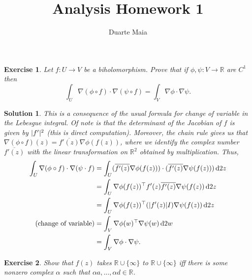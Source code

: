\documentclass{article}
\title{Analysis Homework 1}
\author{Duarte Maia}
\newtheorem{ex}{Exercise}
\theoremstyle{nonumberplain}
\newtheorem{sol}{Solution}
\newcommand{\R}{\mathbb{R}}
\newcommand{\conj}[1]{\overline{#1}}
\newcommand{\transp}{\top}
\DeclarePairedDelimiter{\abs}{\lvert}{\rvert}
\begin{document}
\maketitle

\begin{ex}
Let $f \colon U \to V$ be a biholomorphism. Prove that if $\phi, \psi \colon V \to \R$ are $C^1$ then
\begin{equation}
\int_U \nabla(\phi \circ f) \cdot \nabla(\psi \circ f) = \int_V \nabla \phi \cdot \nabla \psi.
\end{equation}
\end{ex}

\begin{sol}
This is a consequence of the usual formula for change of variable in the Lebesgue integral. Of note is that the determinant of the Jacobian of $f$ is given by $\abs{f'}^2$ (this is direct computation). Moreover, the chain rule gives us that $\nabla(\phi \circ f)(z) = \conj{f'(z)} \nabla \phi(f(z))$, where we identify the complex number $\conj{f'(z)}$ with the linear transformation on $\R^2$ obtained by multiplication. Thus,
\begin{equation}
\begin{aligned}
\int_U \nabla(\phi \circ f) \cdot \nabla(\psi \cdot f) 
&= \int_U (\conj{f'(z)} \nabla \phi(f(z))) \cdot (\conj{f'(z)} \nabla \psi( f(z))) \dl2 z\\
&= \int_U \nabla \phi(f(z))^\transp f'(z) \conj{f'(z)} \nabla \psi( f(z)) \dl2 z\\
&= \int_U \nabla \phi(f(z))^\transp (\abs{f'(z)} I) \nabla \psi( f(z)) \dl2 z\\
\text{(change of variable)} &= \int_V \nabla \phi(w)^\transp \nabla \psi(w) \dl2 w\\
&= \int_V \nabla \phi \cdot \nabla \psi.
\end{aligned}
\end{equation}
\end{sol}

\begin{ex}
Show that $f(z)$ takes $\R \cup \{\infty\}$ to $\R \cup \{\infty\}$ iff there is some nonzero complex $\alpha$ such that $\alpha a, \dots, \alpha d \in \R$.
\end{ex}
\end{document}
